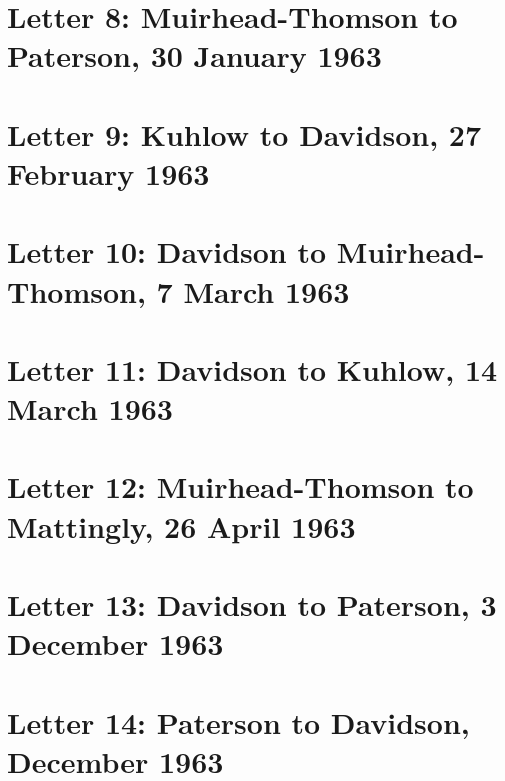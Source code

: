 \documentclass[a4paper,11pt,abstracton,hidelinks]{scrartcl}
\begin{document}
\section{Letter 8: Muirhead-Thomson to Paterson, 30 January 1963}


\section{Letter 9: Kuhlow to Davidson, 27 February 1963}


\section{Letter 10: Davidson to Muirhead-Thomson, 7 March 1963}


\section{Letter 11: Davidson to Kuhlow, 14 March 1963}


\section{Letter 12: Muirhead-Thomson to Mattingly, 26 April 1963}


\section{Letter 13: Davidson to Paterson, 3 December 1963}


\section{Letter 14: Paterson to Davidson, December 1963}

\end{document}
